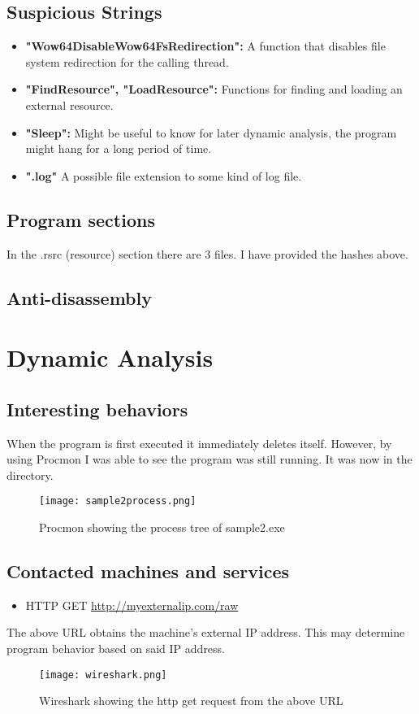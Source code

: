 \documentclass{article}
\begin{document}
    \subsection{Suspicious Strings}
    \begin{itemize}
        \item \textbf{"Wow64DisableWow64FsRedirection":} A function that disables file system redirection for the calling thread.
        \item \textbf{"FindResource", "LoadResource":} Functions for finding and loading an external resource.
        \item \textbf{"Sleep":} Might be useful to know for later dynamic analysis, the program might hang for a long period of time.
        \item \textbf{".log"} A possible file extension to some kind of log file.
    \end{itemize}

    \subsection{Program sections}
    In the .rsrc (resource) section there are 3 files. I have provided the hashes above.

    \subsection{Anti-disassembly}

    \section{Dynamic Analysis}

    \subsection{Interesting behaviors}
    When the program is first executed it immediately deletes itself. However, by using Procmon I was able to see the program was still running. It was now in the  directory.
    \begin{figure}[h]
        \texttt{[image: sample2process.png]}
        \caption{Procmon showing the process tree of sample2.exe}
    \end{figure}

    \subsection{Contacted machines and services}
    \begin{itemize}
        \item HTTP GET \url{http://myexternalip.com/raw}
    \end{itemize}
    The above URL obtains the machine's external IP address. This may determine program behavior based on said IP address.
    \begin{figure}[h]
        \texttt{[image: wireshark.png]}
        \caption{Wireshark showing the http get request from the above URL }
    \end{figure}
\end{document}
